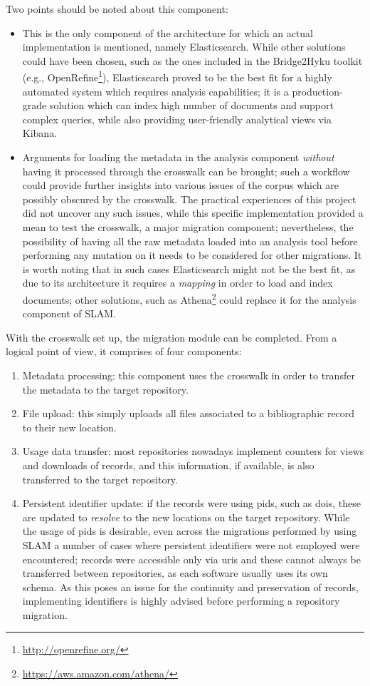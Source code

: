 Two points should be noted about this component:
\begin{itemize}
    \item This is the only component of the architecture for which an actual implementation is mentioned, namely Elasticsearch. While other solutions could have been chosen, such as the ones included in the Bridge2Hyku toolkit\cite{bridge} (e.g., OpenRefine\footnote{\url{http://openrefine.org/}}), Elasticsearch proved to be the best fit for a highly automated system which requires analysis capabilities; it is a production-grade solution which can index high number of documents and support complex queries, while also providing user-friendly analytical views via Kibana.
    \item Arguments for loading the metadata in the analysis component \emph{without} having it processed through the crosswalk can be brought; such a workflow could provide further insights into various issues of the corpus which are possibly obscured by the crosswalk. The practical experiences of this project did not uncover any such issues, while this specific implementation provided a mean to test the crosswalk, a major migration component; nevertheless, the possibility of having all the raw metadata loaded into an analysis tool before performing any mutation on it needs to be considered for other migrations. It is worth noting that in such cases Elasticsearch might not be the best fit, as due to its architecture it requires a \emph{mapping} in order to load and index documents\cite{mapping}; other solutions, such as Athena\footnote{\url{https://aws.amazon.com/athena/}} could replace it for the analysis component of SLAM.
\end{itemize}

With the crosswalk set up, the migration module can be completed. From a logical point of view, it comprises of four components:
\begin{enumerate}
    \item Metadata processing: this component uses the crosswalk in order to transfer the metadata to the target repository.
    \item File upload: this simply uploads all files associated to a bibliographic record to their new location.
    \item Usage data transfer: most repositories nowadays implement counters for views and downloads of records, and this information, if available, is also transferred to the target repository.
    \item Persistent identifier update: if the records were using \glspl{pid}, such as \glspl{doi}, these are updated to \emph{resolve} to the new locations on the target repository. While the usage of \glspl{pid} is desirable, even across the migrations performed by using SLAM a number of cases where persistent identifiers were not employed were encountered; records were accessible only via \glspl{uri} and these cannot always be transferred between repositories, as each software usually uses its own schema. As this poses an issue for the continuity and preservation of records, implementing identifiers is highly advised before performing a repository migration.
\end{enumerate}

